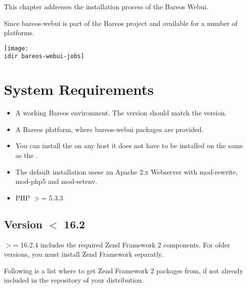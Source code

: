 
This chapter addresses the installation process of the Bareos Webui.

Since  bareos-webui is part of the Bareos project and available for a number of platforms.

\begin{center}
  \texttt{[image: \\idir bareos-webui-jobs]}
\end{center}

\section{System Requirements}

\begin{itemize}
\item A working Bareos environment. The \bareosDir version should match the \bareosWebui version.
\item A Bareos platform, where bareos-webui packages are provided.
\item You can install the \bareosWebui on any host it does not have to be installed on the same as the \bareosDir.
\item The default installation usese an Apache 2.x Webserver with mod-rewrite, mod-php5 and mod-setenv.
\item PHP $>$= 5.3.3
\end{itemize}

\subsection{Version $<$ 16.2}

\bareosWebui $>$= 16.2.4 includes the required Zend Framework 2 components. For older versions, you must install Zend Framework separatly.

Following is a list where to get Zend Framework 2 packages from, if not already included in the repository of your distribution.

